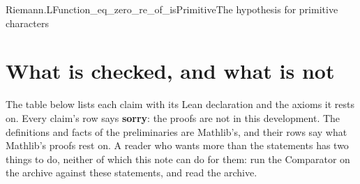 \documentclass{article}
\begin{document}
\begin{leanclaim}[claim, sum=oM-6c5yAF7]{Riemann.LFunction_eq_zero_re_of_isPrimitive}{The hypothesis for primitive characters}
\label{claim:Riemann.LFunction_eq_zero_re_of_isPrimitive}
\end{leanclaim}

\section{What is checked, and what is not}

The table below lists each claim with its Lean declaration and the axioms it
rests on. Every claim's row says \textbf{sorry}: the proofs are not in this
development. The definitions and facts of the preliminaries are Mathlib's,
and their rows say what Mathlib's proofs rest on. A reader who wants more than the statements has two things to
do, neither of which this note can do for them: run the Comparator on the
archive against these statements, and read the archive.
\end{document}
